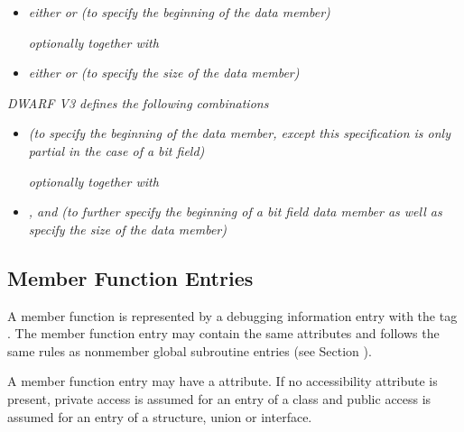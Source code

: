 \begin{itemize}
\item \textit{either  or
 (to specify the beginning of the
data member)}

\textit{optionally together with}

\item  \textit{either  or  (to
specify the size of the data member)}

\end{itemize}

\textit{DWARF V3 defines the following combinations}

\begin{itemize}
\item \textit{ (to specify the beginning
of the data member, except this specification is only partial
in the case of a bit field) }

\textit{optionally together with}

\item \textit{,  and 
(to further specify the beginning of a bit field data member
as well as specify the size of the data member) }
\end{itemize}

\subsection{Member Function Entries}
\label{chap:memberfunctionentries}

A member function is represented by a debugging information
entry with the tag . The member function entry
may contain the same attributes and follows the same rules
as non\dash member global subroutine entries 
(see Section ).

A member function entry may have a 
attribute. If no accessibility attribute is present, private
access is assumed for an entry of a class and public access
is assumed for an entry of a structure, union or interface.

